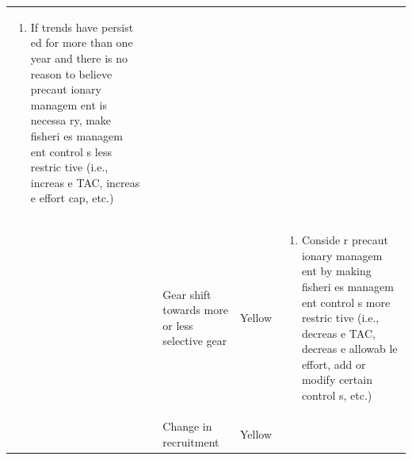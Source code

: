 \documentclass[]{book}
\providecommand{\tightlist}{%
  \setlength{\itemsep}{0pt}\setlength{\parskip}{0pt}}
\begin{document}
\begin{longtable}[]{@{}lllll@{}}
\begin{minipage}[t]{0.19\columnwidth}
\begin{enumerate}
\def\labelenumi{\arabic{enumi}.}
\setcounter{enumi}{1}
\tightlist
\item
  If trends have persist ed for more than one year and there is no
  reason to believe precaut ionary managem ent is necessa ry, make
  fisheri es managem ent control s less restric tive (i.e., increas e
  TAC, increas e effort cap, etc.)
\end{enumerate}\strut
\end{minipage}\tabularnewline
\begin{minipage}[t]{0.19\columnwidth}\raggedright\strut
\strut
\end{minipage} & \begin{minipage}[t]{0.19\columnwidth}\raggedright\strut
\strut
\end{minipage} & \begin{minipage}[t]{0.19\columnwidth}\raggedright\strut
Gear shift towards more or less selective gear\strut
\end{minipage} & \begin{minipage}[t]{0.19\columnwidth}\raggedright\strut
Yellow\strut
\end{minipage} & \begin{minipage}[t]{0.19\columnwidth}\raggedright\strut
\begin{enumerate}
\def\labelenumi{\arabic{enumi}.}
\tightlist
\item
  Conside r precaut ionary managem ent by making fisheri es managem ent
  control s more restric tive (i.e., decreas e TAC, decreas e allowab le
  effort, add or modify certain control s, etc.)
\end{enumerate}\strut
\end{minipage}\tabularnewline
\begin{minipage}[t]{0.19\columnwidth}\raggedright\strut
\strut
\end{minipage} & \begin{minipage}[t]{0.19\columnwidth}\raggedright\strut
\strut
\end{minipage} & \begin{minipage}[t]{0.19\columnwidth}\raggedright\strut
Change in recruitment\strut
\end{minipage} & \begin{minipage}[t]{0.19\columnwidth}\raggedright\strut
Yellow\strut
\end{minipage} & \begin{minipage}[t]{0.19\columnwidth}\raggedright\strut
\begin{enumerate}

\end{enumerate}
\end{minipage}
\end{longtable}
\end{document}
